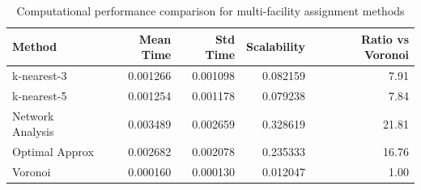\begin{table}
\caption{Computational performance comparison for multi-facility assignment methods}
\label{tab:multifacility_performance}
\begin{tabular}{lrrrr}
\toprule
Method & Mean Time & Std Time & Scalability & Ratio vs Voronoi \\
\midrule
k-nearest-3 & 0.001266 & 0.001098 & 0.082159 & 7.91 \\
k-nearest-5 & 0.001254 & 0.001178 & 0.079238 & 7.84 \\
Network Analysis & 0.003489 & 0.002659 & 0.328619 & 21.81 \\
Optimal Approx & 0.002682 & 0.002078 & 0.235333 & 16.76 \\
Voronoi & 0.000160 & 0.000130 & 0.012047 & 1.00 \\
\bottomrule
\end{tabular}
\end{table}